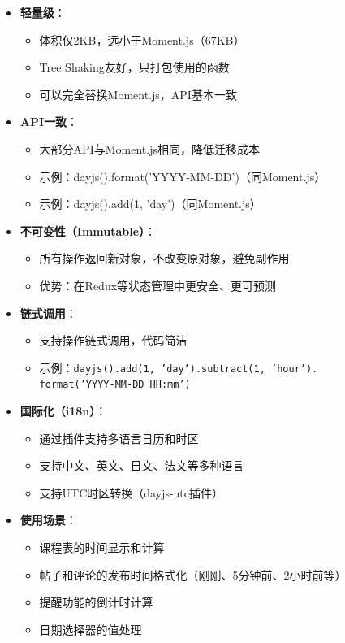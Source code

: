 \documentclass[12pt,a4paper]{article}
\begin{document}
\begin{itemize}
    \item \textbf{轻量级}：
        \begin{itemize}
            \item 体积仅2KB，远小于Moment.js（67KB）
            \item Tree Shaking友好，只打包使用的函数
            \item 可以完全替换Moment.js，API基本一致
        \end{itemize}
    \item \textbf{API一致}：
        \begin{itemize}
            \item 大部分API与Moment.js相同，降低迁移成本
            \item 示例：dayjs().format('YYYY-MM-DD')（同Moment.js）
            \item 示例：dayjs().add(1, 'day')（同Moment.js）
        \end{itemize}
    \item \textbf{不可变性（Immutable）}：
        \begin{itemize}
            \item 所有操作返回新对象，不改变原对象，避免副作用
            \item 优势：在Redux等状态管理中更安全、更可预测
        \end{itemize}
    \item \textbf{链式调用}：
        \begin{itemize}
            \item 支持操作链式调用，代码简洁
            \item 示例：\texttt{dayjs().add(1, 'day').subtract(1, 'hour').\\format('YYYY-MM-DD HH:mm')}
        \end{itemize}
    \item \textbf{国际化（i18n）}：
        \begin{itemize}
            \item 通过插件支持多语言日历和时区
            \item 支持中文、英文、日文、法文等多种语言
            \item 支持UTC时区转换（dayjs-utc插件）
        \end{itemize}
    \item \textbf{使用场景}：
        \begin{itemize}
            \item 课程表的时间显示和计算
            \item 帖子和评论的发布时间格式化（刚刚、5分钟前、2小时前等）
            \item 提醒功能的倒计时计算
            \item 日期选择器的值处理
        \end{itemize}
\end{itemize}
\end{document}
